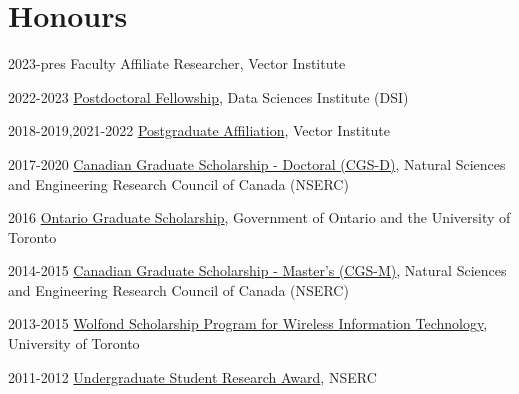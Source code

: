 \documentclass{article}
\begin{document}
\section{Honours}
\begin{CV}

  \item[2023-pres] Faculty Affiliate Researcher, Vector Institute
  
  \item[2022-2023] \href{https://datasciences.utoronto.ca/postdoctoral-fellows/}
    {Postdoctoral Fellowship}, Data Sciences Institute (DSI)

  \item[2018-2019,2021-2022] \href{https://vectorinstitute.ai/2021/03/31/vector-welcomes-new-researchers-to-postgraduate-affiliate-program/}
    {Postgraduate Affiliation}, Vector Institute

  \item[2017-2020] \href{http://www.nserc-crsng.gc.ca/Students-Etudiants/PG-CS/BellandPostgrad-BelletSuperieures_eng.asp}
    {Canadian Graduate Scholarship - Doctoral (CGS-D)}, Natural Sciences and
    Engineering Research Council of Canada (NSERC)

  \item[2016] \href{https://osap.gov.on.ca/OSAPPortal/en/A-ZListofAid/PRDR013089.html}
    {Ontario Graduate Scholarship}, Government of Ontario and the University of
    Toronto

  \item[2014-2015] \href{http://www.nserc-crsng.gc.ca/Students-Etudiants/PG-CS/CGSM-BESCM_eng.asp}
    {Canadian Graduate Scholarship - Master's (CGS-M)}, Natural Sciences and
    Engineering Research Council of Canada (NSERC)

  \item[2013-2015] \href{http://www.artsci.utoronto.ca/graduate/scholarships-awards/scholarships-by-department/computer-science}
    {Wolfond Scholarship Program for Wireless Information Technology},
    University of Toronto

  \item[2011-2012] \href{http://www.nserc-crsng.gc.ca/Students-Etudiants/UG-PC/USRA-BRPC_eng.asp}
    {Undergraduate Student Research Award}, NSERC

\end{CV}
\end{document}
